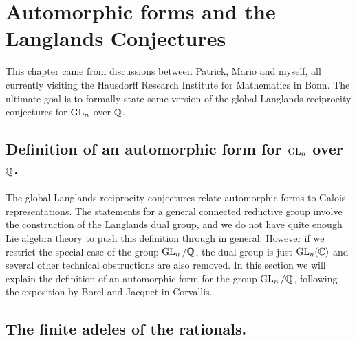 \chapter{Automorphic forms and the Langlands Conjectures}

This chapter came from discussions between Patrick, Mario and myself, all currently
visiting the Hausdorff Research Institute for
Mathematics in Bonn. The ultimate goal is to formally state some version of the global Langlands
reciprocity conjectures for $\operatorname{GL}_n$ over $\mathbb{Q}$.

\section[Definition of an automorphic form]{Definition of an automorphic form for $\operatorname{GL}_n$ over $\mathbb{Q}$.}

The global Langlands reciprocity conjectures relate automorphic forms to Galois representations.
The statements for a general connected reductive group involve the construction of the Langlands
dual group, and we do not have quite enough Lie algebra theory to push this definition through
in general. However if we restrict the special case of the group $\operatorname{GL}_n/\mathbb{Q}$, the dual group
is just $\operatorname{GL}_n(\mathbb{C})$ and several other technical obstructions are also removed. In this
section we will explain the definition of an automorphic form for the group $\operatorname{GL}_n/\mathbb{Q}$, following
the exposition by Borel and Jacquet in Corvallis.

\section{The finite adeles of the rationals.}

